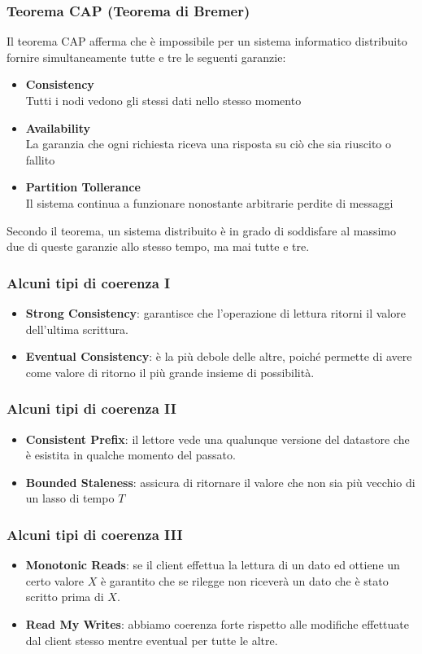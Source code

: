 \begin{frame}
\frametitle{Teorema CAP (Teorema di Bremer)}
	\begin{definizione}
	 Il \alert{teorema CAP} afferma che è impossibile per un sistema informatico distribuito fornire simultaneamente tutte e tre le seguenti garanzie:
	\begin{itemize}
		\item \textbf{Consistency}\\
		Tutti i nodi vedono gli stessi dati nello stesso momento
		\item \textbf{Availability}\\
	    La garanzia che ogni richiesta riceva una risposta su ciò che sia riuscito o fallito
		\item \textbf{Partition Tollerance}\\
		Il sistema continua a funzionare nonostante arbitrarie perdite di messaggi
	\end{itemize}
	Secondo il teorema, un sistema distribuito è in grado di soddisfare al massimo due di queste garanzie allo stesso tempo, ma mai tutte e tre.
	\end{definizione}
\end{frame}

\begin{frame}
\frametitle{Alcuni tipi di coerenza I}
\begin{itemize}
  \item \textbf{Strong Consistency}: garantisce che l'operazione di lettura ritorni il valore dell'ultima scrittura.
  \item \textbf{Eventual Consistency}: è la più debole delle altre, poiché permette di avere come valore di ritorno il più grande insieme di possibilità.
\end{itemize}
\end{frame}

\begin{frame}
\frametitle{Alcuni tipi di coerenza II}
\begin{itemize}
  \item \textbf{Consistent Prefix}: il lettore vede una qualunque versione del datastore che è esistita in qualche momento del passato.
  \item \textbf{Bounded Staleness}: assicura di ritornare il valore che non sia più vecchio di un lasso di tempo $T$
\end{itemize}
\end{frame}

\begin{frame}
\frametitle{Alcuni tipi di coerenza III}
\begin{itemize}
  \item \textbf{Monotonic Reads}: se il client effettua la lettura di un dato ed ottiene un certo valore $X$ è garantito che se rilegge non riceverà un dato che è stato scritto prima di $X$.
  \item \textbf{Read My Writes}: abbiamo coerenza forte rispetto alle modifiche effettuate dal client stesso mentre eventual per tutte le altre.
\end{itemize}
\end{frame}

